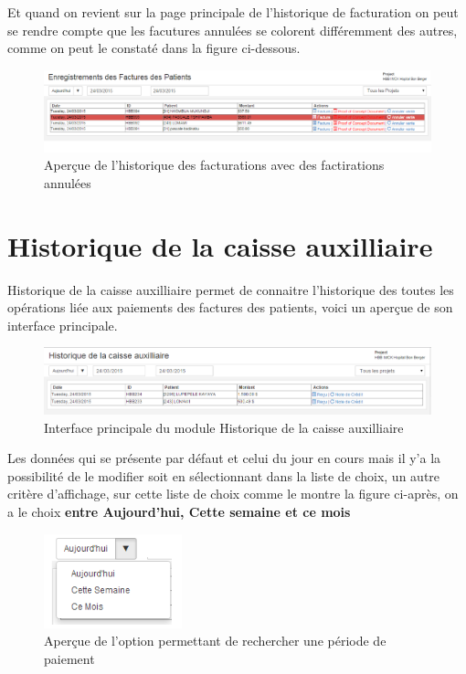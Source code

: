 \documentclass[12pt,a4paper]{report}
\begin{document}
Et quand on revient sur la page principale de l'historique de facturation on peut se rendre compte que les facutures annulées se colorent différemment des autres, comme on peut le constaté dans la figure ci-dessous.

\begin{figure}[h]
\begin{center}
\includegraphics[width=14cm]{pic/HistoriqueVenteDell.png}
\end{center}
\caption{Aperçue de l'historique des facturations avec des factirations annulées}
\label{Aperçue de l'historique des facturations avec des facturations annulées}
\end{figure}

\newpage
\section{Historique de la caisse auxilliaire}
Historique de la caisse auxilliaire permet de connaitre l'historique des toutes les opérations liée aux paiements des factures des patients, voici un aperçue de son interface principale.

\begin{figure}[h]
\begin{center}
\includegraphics[width=14cm]{pic/HistCaAux.png}
\end{center}
\caption{Interface principale du module Historique de la caisse auxilliaire}
\label{Interface principale du module Historique de la caisse auxilliaire}
\end{figure}

Les données qui se présente par défaut et celui du jour en cours mais il y'a la possibilité de le modifier soit en sélectionnant dans la liste de choix, un autre critère d'affichage, sur cette liste de choix comme le montre la figure ci-après, on a le choix \textbf{entre Aujourd'hui, Cette semaine et ce mois} 


\begin{figure}[h]
\begin{center}
\includegraphics[width=4cm]{pic/SelectJour.png}
\end{center}
\caption{Aperçue de l'option permettant de rechercher une période de paiement}
\label{Aperçue de l'option permettant de rechercher une période de paiement}
\end{figure}
\end{document}
